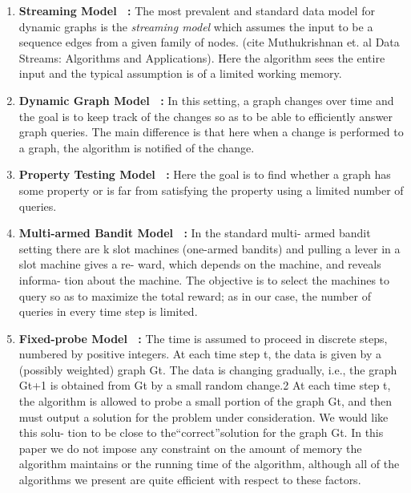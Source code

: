 \begin{enumerate}
	\item {\textbf{Streaming Model~\cite{muthukrishnan2005data} :}} The most prevalent and standard data model for dynamic graphs is the \emph{streaming model} which assumes the input to be a sequence edges from a given family of nodes. (cite Muthukrishnan et. al Data Streams: Algorithms and Applications). Here the algorithm sees the entire input and the typical assumption is of a limited working memory. 

	
	
	\item {\textbf{Dynamic Graph Model~\cite{demetrescu_algorithms_2010} :}} In this setting, a graph changes over time and the goal is to keep track of the changes so as to be able to efficiently answer graph queries. The main difference is that here when a change is performed to a graph, the algorithm is notified of the change.


	\item {\textbf{Property Testing Model~\cite{ron_algorithmic_2010} :}}  Here the goal is to find whether a graph has some property or is far from satisfying the property using a limited number of queries. 

	\item {\textbf{Multi-armed Bandit Model~\cite{muthukrishnan2005data} :}}  In the standard multi- armed bandit setting there are k slot machines (one-armed bandits) and pulling a lever in a slot machine gives a re- ward, which depends on the machine, and reveals informa- tion about the machine. The objective is to select the machines to query so as to maximize the total reward; as in our case, the number of queries in every time step is limited. 

	\item {\textbf{Fixed-probe Model~\cite{anagnostopoulos_algorithms_2012} :}} The time is assumed to proceed in discrete steps, numbered by positive integers. At each time step t, the data is given by a (possibly weighted) graph Gt. The data is changing gradually, i.e., the graph Gt+1 is obtained from Gt by a small random change.2 At each time step t, the algorithm is allowed to probe a small portion of the graph Gt, and then must output a solution for the problem under consideration. We would like this solu- tion to be close to the“correct”solution for the graph Gt. In this paper we do not impose any constraint on the amount of memory the algorithm maintains or the running time of the algorithm, although all of the algorithms we present are quite efficient with respect to these factors.


\end{enumerate}
